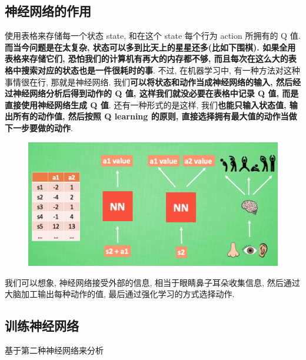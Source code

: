 \documentclass[UTF8,a4paper,12pt]{ctexbook}
\begin{document}
		\subsection{神经网络的作用}
			使用表格来存储每一个状态 state, 和在这个 state 每个行为 action 所拥有的 Q 值. \textbf{而当今问题是在太复杂, 状态可以多到比天上的星星还多(比如下围棋). 如果全用表格来存储它们, 恐怕我们的计算机有再大的内存都不够, 而且每次在这么大的表格中搜索对应的状态也是一件很耗时的事}. 不过, 在机器学习中, 有一种方法对这种事情很在行, 那就是神经网络. 我们\textbf{可以将状态和动作当成神经网络的输入, 然后经过神经网络分析后得到动作的 Q 值, 这样我们就没必要在表格中记录 Q 值, 而是直接使用神经网络生成 Q 值}. 还有一种形式的是这样, 我们\textbf{也能只输入状态值, 输出所有的动作值, 然后按照 Q learning 的原则, 直接选择拥有最大值的动作当做下一步要做的动作}. 
			
			\begin{figure}[H]
				\centering
				\includegraphics[width=.9\linewidth]{DQN2}
			\end{figure}
		
			我们可以想象, 神经网络接受外部的信息, 相当于眼睛鼻子耳朵收集信息, 然后通过大脑加工输出每种动作的值, 最后通过强化学习的方式选择动作.
			
		\subsection{训练神经网络}
			基于第二种神经网络来分析
			
\end{document}
